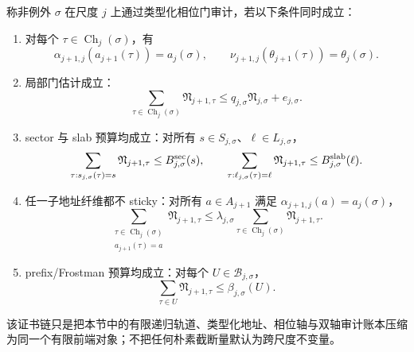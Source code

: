 \begin{definition}[类型化相位门证书链]
称非例外 \(\sigma\) 在尺度 \(j\) 上通过类型化相位门审计，若以下条件同时成立：
\begin{enumerate}
  \item 对每个 \(\tau\in\operatorname{Ch}_j(\sigma)\)，有
  \[
  \alpha_{j+1,j}(a_{j+1}(\tau))=a_j(\sigma),
  \qquad
  \nu_{j+1,j}(\theta_{j+1}(\tau))=\theta_j(\sigma).
  \]
  \item 局部门估计成立：
  \[
  \sum_{\tau\in\operatorname{Ch}_j(\sigma)}\mathfrak N_{j+1,\tau}
  \le q_{j,\sigma}\mathfrak N_{j,\sigma}+e_{j,\sigma}.
  \]
  \item sector 与 slab 预算均成立：对所有 \(s\in S_{j,\sigma}\)、\(\ell\in L_{j,\sigma}\)，
  \[
  \sum_{\tau:s_{j,\sigma}(\tau)=s}\mathfrak N_{j+1,\tau}\le B^{\rm sec}_{j,\sigma}(s),
  \qquad
  \sum_{\tau:\ell_{j,\sigma}(\tau)=\ell}\mathfrak N_{j+1,\tau}\le B^{\rm slab}_{j,\sigma}(\ell).
  \]
  \item 任一子地址纤维都不 sticky：对所有 \(a\in A_{j+1}\) 满足 \(\alpha_{j+1,j}(a)=a_j(\sigma)\)，
  \[
  \sum_{\substack{\tau\in\operatorname{Ch}_j(\sigma)\\ a_{j+1}(\tau)=a}}\mathfrak N_{j+1,\tau}
  \le
  \lambda_{j,\sigma}
  \sum_{\tau\in\operatorname{Ch}_j(\sigma)}\mathfrak N_{j+1,\tau}.
  \]
  \item prefix/Frostman 预算均成立：对每个 \(U\in\mathcal B_{j,\sigma}\)，
  \[
  \sum_{\tau\in U}\mathfrak N_{j+1,\tau}\le\beta_{j,\sigma}(U).
  \]
\end{enumerate}
该证书链只是把本节中的有限递归轨道、类型化地址、相位轴与双轴审计账本压缩为同一个有限前端对象；不把任何朴素截断量默认为跨尺度不变量。
\end{definition}

